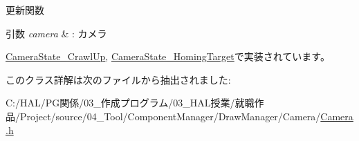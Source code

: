 更新関数 


\begin{DoxyParams}{引数}
{\em camera} & \+: カメラ \\
\hline
\end{DoxyParams}


\mbox{\hyperlink{class_camera_state___crawl_up_aaebd2634f1677b7c00e6761ed91e1264}{Camera\+State\+\_\+\+Crawl\+Up}}, \mbox{\hyperlink{class_camera_state___homing_target_a98f04985c06033febdad32d6357088c9}{Camera\+State\+\_\+\+Homing\+Target}}で実装されています。



このクラス詳解は次のファイルから抽出されました\+:\begin{DoxyCompactItemize}
\item 
C\+:/\+H\+A\+L/\+P\+G関係/03\+\_\+作成プログラム/03\+\_\+\+H\+A\+L授業/就職作品/\+Project/source/04\+\_\+\+Tool/\+Component\+Manager/\+Draw\+Manager/\+Camera/\mbox{\hyperlink{_camera_8h}{Camera.\+h}}\end{DoxyCompactItemize}
